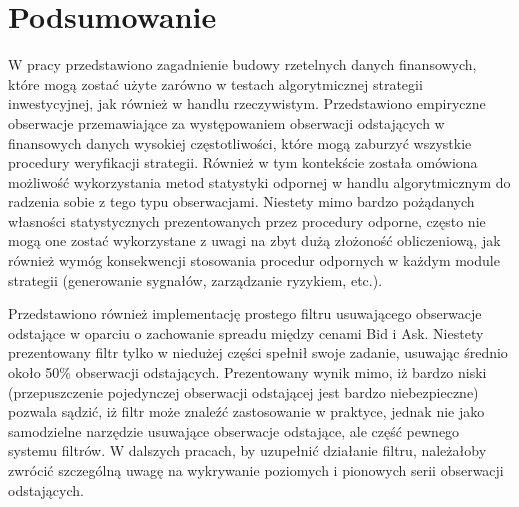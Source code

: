 \documentclass[a4paper,12pt,openany, DIV=calc, headsepline]{scrbook}
\begin{document}
\chapter{Podsumowanie}

W pracy przedstawiono zagadnienie budowy rzetelnych danych finansowych, które mogą zostać użyte zarówno w testach algorytmicznej strategii inwestycyjnej, jak również w handlu rzeczywistym. Przedstawiono empiryczne obserwacje przemawiające za występowaniem obserwacji odstających w finansowych danych wysokiej częstotliwości, które mogą zaburzyć wszystkie procedury weryfikacji strategii. Również w tym kontekście została omówiona możliwość wykorzystania metod statystyki odpornej w handlu algorytmicznym do radzenia sobie z tego typu obserwacjami. Niestety mimo bardzo pożądanych własności statystycznych prezentowanych przez procedury odporne, często nie mogą one zostać wykorzystane z uwagi na zbyt dużą złożoność obliczeniową, jak również wymóg konsekwencji stosowania procedur odpornych w każdym module strategii (generowanie sygnałów, zarządzanie ryzykiem, etc.).

Przedstawiono również implementację prostego filtru usuwającego obserwacje odstające w oparciu o zachowanie spreadu między cenami Bid i Ask. Niestety prezentowany filtr tylko w niedużej części spełnił swoje zadanie, usuwając średnio około 50\% obserwacji odstających. Prezentowany wynik mimo, iż bardzo niski (przepuszczenie pojedynczej obserwacji odstającej jest bardzo niebezpieczne) pozwala sądzić, iż filtr może znaleźć zastosowanie w praktyce, jednak nie jako samodzielne narzędzie usuwające obserwacje odstające, ale część pewnego systemu filtrów. W dalszych pracach, by uzupełnić działanie filtru, należałoby zwrócić szczególną uwagę na wykrywanie poziomych i pionowych serii obserwacji odstających.



\listoftables
{}
\listoffigures
{}
\printindex
\end{document}
